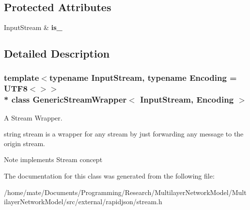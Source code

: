 \subsection*{Protected Attributes}
\begin{DoxyCompactItemize}
\item 
Input\+Stream \& {\bfseries is\+\_\+}\hypertarget{classGenericStreamWrapper_a2b44ae2c9460c2e18aca6ba25c537cc5}{}\label{classGenericStreamWrapper_a2b44ae2c9460c2e18aca6ba25c537cc5}

\end{DoxyCompactItemize}


\subsection{Detailed Description}
\subsubsection*{template$<$typename Input\+Stream, typename Encoding = U\+T\+F8$<$$>$$>$\\*
class Generic\+Stream\+Wrapper$<$ Input\+Stream, Encoding $>$}

A Stream Wrapper. 

string stream is a wrapper for any stream by just forwarding any  message to the origin stream. \begin{DoxyNote}{Note}
implements Stream concept 
\end{DoxyNote}


The documentation for this class was generated from the following file\+:\begin{DoxyCompactItemize}
\item 
/home/mate/\+Documents/\+Programming/\+Research/\+Multilayer\+Network\+Model/\+Multilayer\+Network\+Model/src/external/rapidjson/stream.\+h\end{DoxyCompactItemize}
